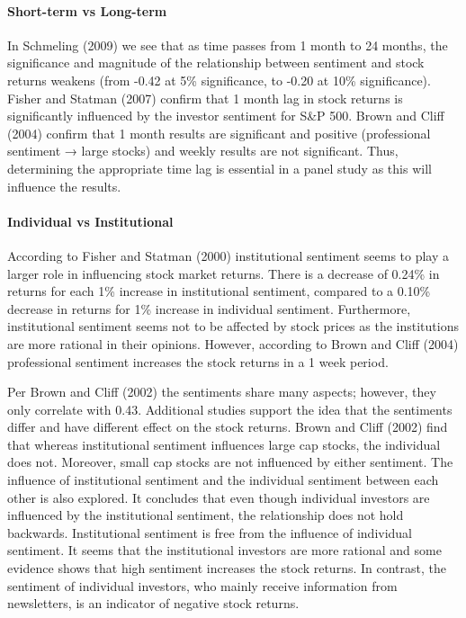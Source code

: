 \paragraph{Short-term vs Long-term} In Schmeling (2009) we see that as time passes from 1 month to 24 months, the significance and magnitude of the relationship between sentiment and stock returns weakens (from -0.42 at 5\% significance, to -0.20 at 10\% significance). Fisher and Statman (2007) confirm that 1 month lag in stock returns is significantly influenced by the investor sentiment for S\&P 500. Brown and Cliff (2004) confirm that 1 month results are significant and positive (professional sentiment → large stocks) and weekly results are not significant. Thus, determining the appropriate time lag is essential in a panel study as this will influence the results.

\paragraph{Individual vs Institutional}
According to Fisher and Statman (2000) institutional sentiment seems to play a larger role in influencing stock market returns. There is a decrease of 0.24\% in returns for each 1\% increase in institutional sentiment, compared to a 0.10\% decrease in returns for 1\% increase in individual sentiment. Furthermore, institutional sentiment seems not to be affected by stock prices as the institutions are more rational in their opinions. However, according to Brown and Cliff (2004) professional sentiment increases the stock returns in a 1 week period.
\par
Per Brown and Cliff (2002) the sentiments share many aspects; however, they only correlate with 0.43. Additional studies support the idea that the sentiments differ and have different effect on the stock returns. Brown and Cliff (2002) find that whereas institutional sentiment influences large cap stocks, the individual does not. Moreover, small cap stocks are not influenced by either sentiment. The influence of institutional sentiment and the individual sentiment between each other is also explored. It concludes that even though individual investors are influenced by the institutional sentiment, the relationship does not hold backwards. Institutional sentiment is free from the influence of individual sentiment. It seems that the institutional investors are more rational and some evidence shows that high sentiment increases the stock returns. In contrast, the sentiment of individual investors, who mainly receive information from newsletters, is an indicator of negative stock returns.

